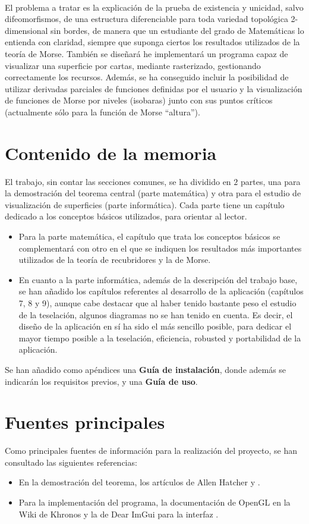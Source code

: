 \\El problema a tratar es la explicación de la prueba de existencia y unicidad, salvo difeomorfismos, de una estructura diferenciable para toda variedad topológica 2-dimensional sin bordes, de manera que un estudiante del grado de Matemáticas lo entienda con claridad, siempre que suponga ciertos los resultados utilizados de la teoría de Morse. También se diseñará he implementará un programa capaz de visualizar una superficie por cartas, mediante rasterizado, gestionando correctamente los recursos. Además, se ha conseguido incluir la posibilidad de utilizar derivadas parciales de funciones definidas por el usuario y la visualización de funciones de Morse por niveles (isobaras) junto con sus puntos críticos (actualmente sólo para la función de Morse ``altura'').

\section*{Contenido de la memoria}
El trabajo, sin contar las secciones comunes, se ha dividido en $2$ partes, una para la demostración del teorema central (parte matemática) y otra para el estudio de visualización de superficies (parte informática). Cada parte tiene un capítulo dedicado a los conceptos básicos utilizados, para orientar al lector.
\begin{itemize}
	\item Para la parte matemática, el capítulo que trata los conceptos básicos se complementará con otro en el que se indiquen los resultados más importantes utilizados de la teoría de recubridores y la de Morse.
	\item En cuanto a la parte informática, además de la descripción del trabajo base, se han añadido los capítulos referentes al desarrollo de la aplicación (capítulos 7, 8 y 9), aunque cabe destacar que al haber tenido bastante peso el estudio de la teselación, algunos diagramas no se han tenido en cuenta. Es decir, el diseño de la aplicación en sí ha sido el más sencillo posible, para dedicar el mayor tiempo posible a la teselación, eficiencia, robusted y portabilidad de la aplicación.
\end{itemize}
Se han añadido como apéndices una \textbf{Guía de instalación}, donde además se indicarán los requisitos previos, y una \textbf{Guía de uso}.

\section*{Fuentes principales}
Como principales fuentes de información para la realización del proyecto, se han consultado las siguientes referencias:
\begin{itemize}
	\item En la demostración del teorema, los artículos de Allen Hatcher \cite{arXiv:1312.3518} y \cite{MorseTh1}.
	\item Para la implementación del programa, la documentación de OpenGL en la Wiki de Khronos \cite{KhronosWiki} y la de Dear ImGui para la interfaz \cite{DearImGui}.
\end{itemize}

\endinput
